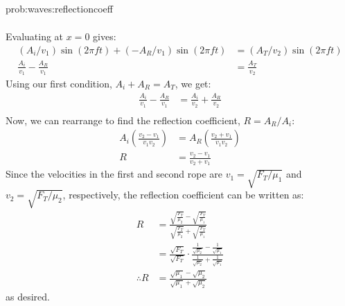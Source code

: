 \begin{solution}{prob:waves:reflectioncoeff}
\begin{enumerate}[(a)]
\begin{align*}
\end{align*}
Evaluating at $x=0$ gives:
\begin{align*}
(A_i/v_1) \sin (2\pi ft) +(-A_R/v_1) \sin (2\pi ft)&=(A_T/v_2) \sin (2\pi ft)\\
\frac{A_i}{v_1} -\frac{A_R}{v_1}&=\frac{A_T}{v_2} 
\end{align*}
Using our first condition, $A_i+A_R=A_T$, we get:
\begin{align*}
\frac{A_i}{v_1} -\frac{A_R}{v_1}&=\frac{A_i}{v_2}+\frac{A_R}{v_2}\\
\end{align*}
Now, we can rearrange to find the reflection coefficient, $R=A_R/A_i$:
\begin{align*}
A_i\left( \frac{v_2-v_1}{v_1v_2}\right)&=A_R\left( \frac{v_2+v_1}{v_1v_2}\right)\\
R&=\frac{v_2-v_1}{v_2+v_1}
\end{align*}
Since the velocities in the first and second rope are $v_1=\sqrt{F_T/\mu_1}$ and $v_2=\sqrt{F_T/\mu_2}$, respectively, the reflection coefficient can be written as:
\begin{align*}
R&=\frac{\sqrt{\frac{F_T}{\mu_2}}-\sqrt{\frac{F_T}{\mu_1}}}{\sqrt{\frac{F_T}{\mu_2}}+\sqrt{\frac{F_T}{\mu_1}}}\\
&=\frac{\sqrt{F_T}}{\sqrt{F_T}}\cdot \frac{\frac{1}{\sqrt{\mu_2}}-\frac{1}{\sqrt{\mu_1}}}{\frac{1}{\sqrt{\mu_2}}+\frac{1}{\sqrt{\mu_1}}}\\
\therefore R&=\frac{\sqrt{\mu_1}-\sqrt{\mu_2}}{\sqrt{\mu_1}+\sqrt{\mu_2}}
\end{align*}
as desired. 
\end{enumerate}
\end{solution}



